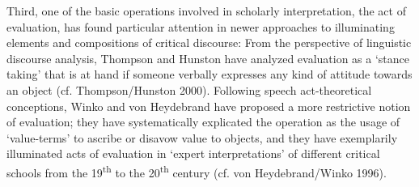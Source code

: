 Third, one of the basic operations involved in scholarly interpretation, the act of evaluation, has found particular attention in newer approaches to illuminating elements and compositions of critical discourse: From the perspective of linguistic discourse analysis, Thompson and Hunston have analyzed evaluation as a `stance taking' that is at hand if someone verbally expresses any kind of attitude towards an object (cf. Thompson/Hunston 2000). Following speech act-theoretical conceptions, Winko and von Heydebrand have proposed a more restrictive notion of evaluation; they have systematically explicated the operation as the usage of `value-terms' to ascribe or disavow value to objects, and they have exemplarily illuminated acts of evaluation in `expert interpretations' of different critical schools from the 19\textsuperscript{th} to the 20\textsuperscript{th} century (cf. von Heydebrand/Winko 1996).
